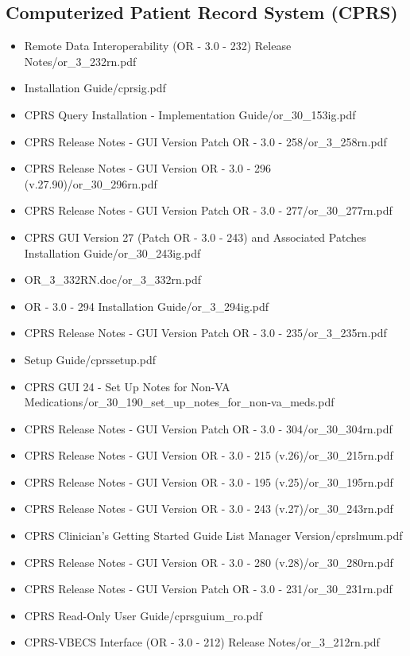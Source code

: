\documentclass{OSEHRAArticle}
\begin{document}
\subsection{ Computerized Patient Record System (CPRS) }

\begin{itemize}
\item Remote Data Interoperability (OR - 3.0 - 232) Release Notes/or\_3\_232rn.pdf
\item Installation Guide/cprsig.pdf
\item CPRS Query Installation - Implementation Guide/or\_30\_153ig.pdf
\item CPRS Release Notes -  GUI Version Patch OR - 3.0 - 258/or\_3\_258rn.pdf
\item CPRS Release Notes -  GUI Version OR - 3.0 - 296 (v.27.90)/or\_30\_296rn.pdf
\item CPRS Release Notes -  GUI Version Patch OR - 3.0 - 277/or\_30\_277rn.pdf
\item CPRS GUI Version 27 (Patch OR - 3.0 - 243) and Associated Patches Installation Guide/or\_30\_243ig.pdf
\item OR\_3\_332RN.doc/or\_3\_332rn.pdf
\item OR - 3.0 - 294 Installation Guide/or\_3\_294ig.pdf
\item CPRS Release Notes -  GUI Version Patch OR - 3.0 - 235/or\_3\_235rn.pdf
\item Setup Guide/cprssetup.pdf
\item CPRS GUI 24 -  Set Up Notes for Non-VA Medications/or\_30\_190\_set\_up\_notes\_for\_non-va\_meds.pdf
\item CPRS Release Notes -  GUI Version Patch OR - 3.0 - 304/or\_30\_304rn.pdf
\item CPRS Release Notes -  GUI Version OR - 3.0 - 215 (v.26)/or\_30\_215rn.pdf
\item CPRS Release Notes -  GUI Version OR - 3.0 - 195 (v.25)/or\_30\_195rn.pdf
\item CPRS Release Notes -  GUI Version OR - 3.0 - 243 (v.27)/or\_30\_243rn.pdf
\item CPRS Clinician's Getting Started Guide List Manager Version/cprslmum.pdf
\item CPRS Release Notes -  GUI Version OR - 3.0 - 280 (v.28)/or\_30\_280rn.pdf
\item CPRS Release Notes -  GUI Version Patch OR - 3.0 - 231/or\_30\_231rn.pdf
\item CPRS Read-Only User Guide/cprsguium\_ro.pdf
\item CPRS-VBECS Interface (OR - 3.0 - 212) Release Notes/or\_3\_212rn.pdf

\end{itemize}
\end{document}
